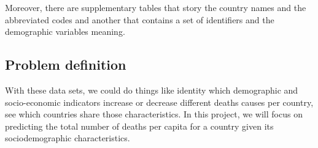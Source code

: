 Moreover, there are supplementary tables that story the country names and the abbreviated codes and another that contains a set of identifiers and the demographic variables meaning.

\subsection{Problem definition}
With these data sets, we could do things like identity which demographic and socio-economic indicators increase or decrease different deaths causes per country, see which countries share those characteristics. In this project, we will focus on predicting the total number of deaths per capita for a country given its sociodemographic characteristics.
